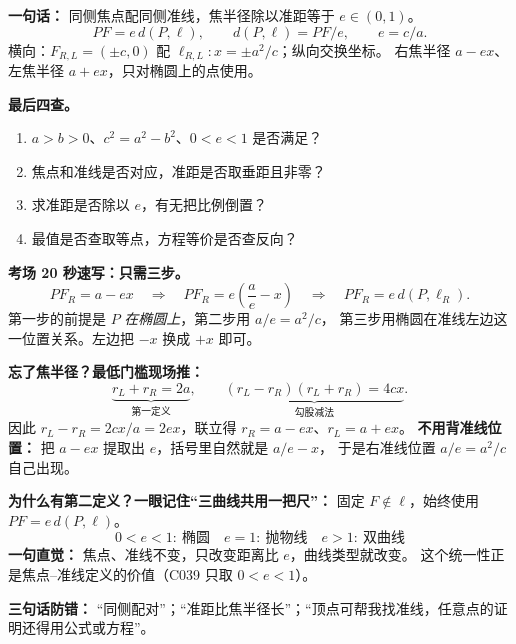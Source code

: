 \clearpage
\begin{summarybox}
\textbf{一句话：} 同侧焦点配同侧准线，焦半径除以准距等于 $e\in(0,1)$。
\[
PF=e\,d(P,\ell),\qquad d(P,\ell)=PF/e,\qquad e=c/a.
\]
横向：$F_{R,L}=(\pm c,0)$ 配 $\ell_{R,L}:x=\pm a^2/c$；纵向交换坐标。
右焦半径 $a-ex$、左焦半径 $a+ex$，只对椭圆上的点使用。

\textbf{最后四查。}
\begin{enumerate}[leftmargin=*]
\item $a>b>0$、$c^2=a^2-b^2$、$0<e<1$ 是否满足？
\item 焦点和准线是否对应，准距是否取垂距且非零？
\item 求准距是否除以 $e$，有无把比例倒置？
\item 最值是否查取等点，方程等价是否查反向？
\end{enumerate}
\end{summarybox}

\begin{summarybox}
\textbf{考场 20 秒速写：只需三步。}
\[
\boxed{PF_R=a-ex}
\quad\Longrightarrow\quad
\boxed{PF_R=e\left(\frac ae-x\right)}
\quad\Longrightarrow\quad
\boxed{PF_R=e\,d(P,\ell_R)}.
\]
第一步的前提是 $P$ \emph{在椭圆上}，第二步用 $a/e=a^2/c$，
第三步用椭圆在准线左边这一位置关系。左边把 $-x$ 换成 $+x$ 即可。

\medskip
\textbf{忘了焦半径？最低门槛现场推：}
\[
\underbrace{r_L+r_R=2a}_{\text{第一定义}},\qquad
\underbrace{(r_L-r_R)(r_L+r_R)=4cx}_{\text{勾股减法}}.
\]
因此 $r_L-r_R=2cx/a=2ex$，联立得 $r_R=a-ex$、$r_L=a+ex$。
\textbf{不用背准线位置：} 把 $a-ex$ 提取出 $e$，括号里自然就是 $a/e-x$，
于是右准线位置 $a/e=a^2/c$ 自己出现。

\medskip

\medskip
\textbf{为什么有第二定义？一眼记住“三曲线共用一把尺”：}
固定 $F\notin\ell$，始终使用 $PF=e\,d(P,\ell)$。
\[
\boxed{0<e<1:\ \text{椭圆}\quad e=1:\ \text{抛物线}\quad e>1:\ \text{双曲线}}
\]
\textbf{一句直觉：} 焦点、准线不变，只改变距离比 $e$，曲线类型就改变。
这个统一性正是焦点--准线定义的价值（C039 只取 $0<e<1$）。

\textbf{三句话防错：} “同侧配对”；“准距比焦半径长”；“顶点可帮我找准线，任意点的证明还得用公式或方程”。
\end{summarybox}
